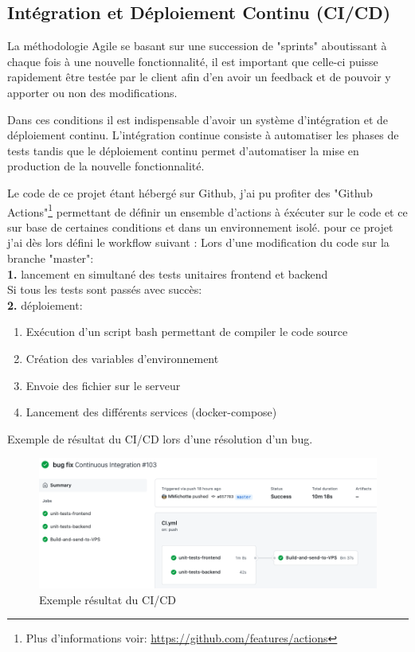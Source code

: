 
\newpage
\subsection{Intégration et Déploiement Continu (CI/CD)}

La méthodologie Agile se basant sur une succession de "sprints" aboutissant à chaque fois à une nouvelle fonctionnalité, il est important que celle-ci puisse rapidement être testée par le client afin d'en avoir un feedback et de pouvoir y apporter ou non des modifications. 

\newpara
Dans ces conditions il est indispensable d'avoir un système d'intégration et de déploiement continu. L'intégration continue consiste à automatiser les phases de tests tandis que le déploiement continu permet d'automatiser la mise en production de la nouvelle fonctionnalité. 

\newpara
Le code de ce projet étant hébergé sur Github, j'ai pu profiter des "Github Actions"\footnote{Plus d'informations voir: \url{https://github.com/features/actions}} permettant de définir un ensemble d'actions à éxécuter sur le code et ce sur base de certaines conditions et dans un environnement isolé. pour ce projet j'ai dès lors défini le workflow suivant :
\linebreak \linebreak
Lors d'une modification du code sur la branche "master": \\
\textbf{1.} lancement en simultané des tests unitaires frontend et backend \\
Si tous les tests sont passés avec succès: \\
\textbf{2.} déploiement:
\begin{enumerate}[label=(\alph*)]
  \item Exécution d'un script bash permettant de compiler le code source
  \item Création des variables d'environnement
  \item Envoie des fichier sur le serveur 
  \item Lancement des différents services (docker-compose)
\end{enumerate}

\newpara

Exemple de résultat du CI/CD lors d'une résolution d'un bug. 
\begin{figure}[H]
  \centering
  \includegraphics[width=\linewidth]{img/CI-result.png}
  \caption{Exemple résultat du CI/CD}
\end{figure}
